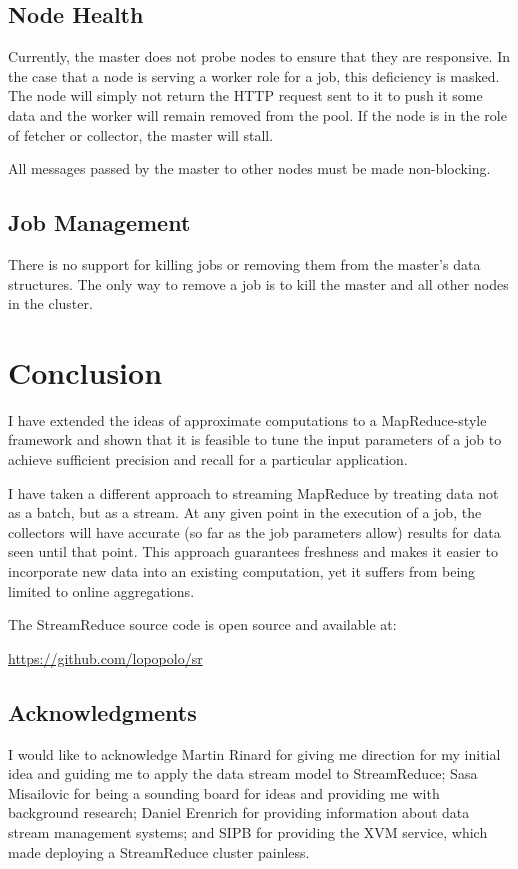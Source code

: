 \documentclass[12pt,twocolumn]{article}
\begin{document}
\subsection{Node Health}
Currently, the master does not probe nodes to ensure that they are responsive. In the case that
a node is serving a worker role for a job, this deficiency is masked. The node will simply not
return the HTTP request sent to it to push it some data and the worker will remain removed from
the pool. If the node is in the role of fetcher or collector, the master will stall.

All messages passed by the master to other nodes must be made non-blocking.

\subsection{Job Management}
There is no support for killing jobs or removing them from the master's data structures. The only
way to remove a job is to kill the master and all other nodes in the cluster.

\section{Conclusion}
I have extended the ideas of approximate computations to a MapReduce-style framework and shown
that it is feasible to tune the input parameters of a job to achieve sufficient precision and
recall for a particular application.

I have taken a different approach to streaming MapReduce by treating data not as a batch, but
as a stream. At any given point in the execution of a job, the collectors will have accurate
(so far as the job parameters allow) results for data seen until that point. This approach
guarantees freshness and makes it easier to incorporate new data into an existing computation,
yet it suffers from being limited to online aggregations.

The StreamReduce source code is open source and available at:
\begin{center}
  \url{https://github.com/lopopolo/sr}
\end{center}

\subsection*{Acknowledgments}
I would like to acknowledge Martin Rinard for giving me direction for my initial idea
and guiding me to apply the data stream model to StreamReduce; Sasa Misailovic for being
a sounding board for ideas and providing me with background research; Daniel Erenrich for
providing information about data stream management systems; and SIPB for providing the
XVM service, which made deploying a StreamReduce cluster painless.

{}

\end{document}
